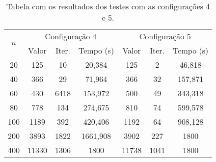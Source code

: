 \documentclass{MO824}
\begin{document}
\vspace{-0.7cm}

\begin{table}[H]
    \centering
     \caption{Tabela com os resultados dos testes com as configurações 4 e 5.}
     \vspace{0.3cm}
      \begin{adjustbox}{max width=\textwidth}
    \begin{tabular}{|c|c|c|c|c|c|c|}
 \hline
 \multicolumn{1}{|c|}{\multirow{2}{*}{$n$}}  & \multicolumn{3}{c|}{Configuração 4}  & \multicolumn{3}{c|}{Configuração 5}    \\ \cline{2-7} 
 \multicolumn{1}{|c|}{} & \multicolumn{1}{c|}{Valor} & \multicolumn{1}{c|}{Iter.} & \multicolumn{1}{c|}{Tempo (s)} & \multicolumn{1}{c|}{Valor} & \multicolumn{1}{c|}{Iter.} & \multicolumn{1}{c|}{Tempo (s)} \\ \hline
 20 & 125 & 10 & 20,384 & 125 & 2 & 46,818\\ \hline
 40 & 366 & 29 & 71,964 & 366 & 32 & 157,871\\ \hline
 60 & 430 & 6418 & 153,972 & 500 & 49 & 343,318\\ \hline
 80 & 778 & 134 & 274,675 & 810 & 74 & 599,578\\ \hline
 100 & 1189 & 392 & 420,406 & 1192 & 64 & 908,128\\ \hline
 200 & 3893 & 1822 & 1661,908 & 3902 & 227 & 1800\\ \hline
 400 & 11330 & 1306 & 1800 & 11738 & 1041 & 1800\\ \hline
    \end{tabular}
    \end{adjustbox}
    \label{tab:conf45}
\end{table}

\vspace{-0.7cm}
\end{document}
